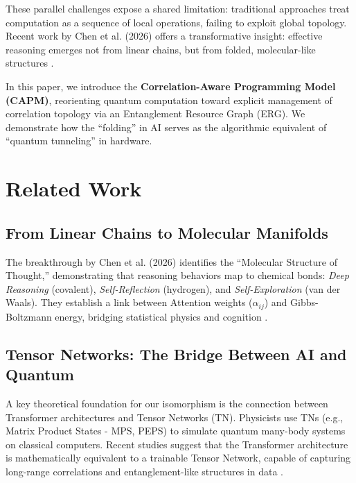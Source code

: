 \documentclass[11pt, a4paper]{article}
\begin{document}
These parallel challenges expose a shared limitation: traditional approaches treat computation as a sequence of local operations, failing to exploit global topology. Recent work by Chen et al. (2026) offers a transformative insight: effective reasoning emerges not from linear chains, but from folded, molecular-like structures \cite{chen2026}.

\begin{center}
\end{center}

In this paper, we introduce the \textbf{Correlation-Aware Programming Model (CAPM)}, reorienting quantum computation toward explicit management of correlation topology via an Entanglement Resource Graph (ERG). We demonstrate how the ``folding'' in AI serves as the algorithmic equivalent of ``quantum tunneling'' in hardware.

\section{Related Work}

\subsection{From Linear Chains to Molecular Manifolds}
The breakthrough by Chen et al. (2026) identifies the ``Molecular Structure of Thought,'' demonstrating that reasoning behaviors map to chemical bonds: \textit{Deep Reasoning} (covalent), \textit{Self-Reflection} (hydrogen), and \textit{Self-Exploration} (van der Waals). They establish a link between Attention weights ($\alpha_{ij}$) and Gibbs-Boltzmann energy, bridging statistical physics and cognition \cite{chen2026}.

\subsection{Tensor Networks: The Bridge Between AI and Quantum}
A key theoretical foundation for our isomorphism is the connection between Transformer architectures and Tensor Networks (TN). Physicists use TNs (e.g., Matrix Product States - MPS, PEPS) to simulate quantum many-body systems on classical computers. Recent studies suggest that the Transformer architecture is mathematically equivalent to a trainable Tensor Network, capable of capturing long-range correlations and entanglement-like structures in data \cite{levine2021, gao2022}.
\end{document}
